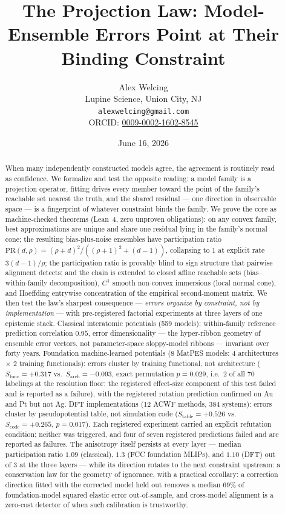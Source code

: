 \documentclass[11pt]{article}
\title{\bfseries The Projection Law: Model-Ensemble Errors Point at Their Binding Constraint}
\author{Alex Welcing\\ \small Lupine Science, Union City, NJ\\ \small \texttt{alexwelcing@gmail.com}\\ \small ORCID: \href{https://orcid.org/0009-0002-1602-8545}{0009-0002-1602-8545}}
\date{June 16, 2026}
\begin{document}
\maketitle

\begin{abstract}
\noindent When many independently constructed models agree, the agreement is
routinely read as confidence. We formalize and test the opposite reading: a
model family is a projection operator, fitting drives every member toward the
point of the family's reachable set nearest the truth, and the shared residual
--- one direction in observable space --- is a fingerprint of whatever
constraint binds the family. We prove the core as machine-checked theorems
(Lean~4, zero unproven obligations): on any convex family, best approximations
are unique and share one residual lying in the family's normal cone; the
resulting bias-plus-noise ensembles have participation ratio
$\mathrm{PR}(d,\rho) = (\rho+d)^2/((\rho+1)^2+(d-1))$, collapsing to 1 at
explicit rate $3(d-1)/\rho$; the participation ratio is provably blind to
sign structure that pairwise alignment detects; and the chain is extended to
closed affine reachable sets (bias--within-family decomposition), $C^1$ smooth
non-convex immersions (local normal cone), and Hoeffding entrywise concentration of
the empirical second-moment matrix. We then test the law's sharpest
consequence --- \emph{errors organize by constraint, not by implementation} ---
with pre-registered factorial experiments at three layers of one epistemic
stack. Classical interatomic potentials (559 models): within-family
reference--prediction correlation $0.95$, error dimensionality --- the
hyper-ribbon geometry of ensemble error vectors, not parameter-space
sloppy-model ribbons --- invariant over forty years. Foundation machine-learned potentials (8 MatPES models: 4
architectures $\times$ 2 training functionals): errors cluster by training
functional, not architecture ($S_{\mathrm{func}}{=}{+}0.317$ vs.\
$S_{\mathrm{arch}}{=}{-}0.093$, exact permutation $p{=}0.029$, i.e.\ 2 of all 70 labelings at the resolution floor; the registered
effect-size component of this test failed and is reported as a failure), with
the registered rotation prediction confirmed on Au and Pt but not Ag. DFT
implementations (12 ACWF methods, 384 systems): errors cluster by
pseudopotential table, not simulation code
($S_{\mathrm{table}}{=}{+}0.526$ vs.\ $S_{\mathrm{code}}{=}{+}0.265$,
$p{=}0.017$). Each registered experiment carried an explicit refutation
condition; neither was triggered, and four of seven registered predictions
failed and are reported as failures. The anisotropy itself persists at every
layer --- median participation ratio $1.09$ (classical), $1.3$ (FCC foundation MLIPs), and $1.10$ (DFT) out of 3
at the three layers --- while its direction rotates to the next constraint
upstream: a conservation law for the geometry of ignorance, with a practical
corollary: a correction direction fitted with the corrected model held out
removes a median $69\%$ of foundation-model squared elastic error
out-of-sample, and cross-model alignment is a zero-cost detector of when such
calibration is trustworthy.
\end{abstract}
\end{document}
